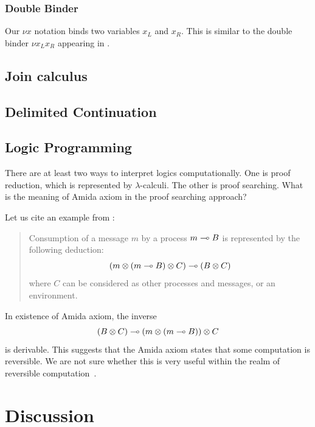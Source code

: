  \subsubsection{Double Binder}
 Our $\nu x$ notation binds two variables $x_L$ and $x_R$.
 This is similar to the double binder $\nu x_L x_R$ appearing in
 \citet{gay2010}.

 \subsection{Join calculus}

\subsection{Delimited Continuation}

 \subsection{Logic Programming}

 There are at least two ways to interpret logics computationally.
 One is proof reduction, which is represented by $\lambda$-calculi.
 The other is proof searching.  What is the meaning of Amida axiom in
 the proof searching approach?

 Let us cite an example from \citet[A.2]{kobayashi-yonezawa}:
 \begin{quote}
  Consumption of a message $m$ by a process $m\multimap B$ is represented by
  the following deduction:
  \[
   (m\otimes(m\multimap B)\otimes C)\multimap (B\otimes C)
  \]
  where $C$ can be considered as other processes and messages, or an environment.
 \end{quote}
 In existence of Amida axiom,
 the inverse
 \[
  (B\otimes C)\multimap (m\otimes (m\multimap B))\otimes C
 \]
 is derivable.
 This suggests that the Amida axiom states that some
 computation is reversible.  We are not sure whether this is very
 useful within the realm of reversible computation~\citep{revcon}.

\section{Discussion}

